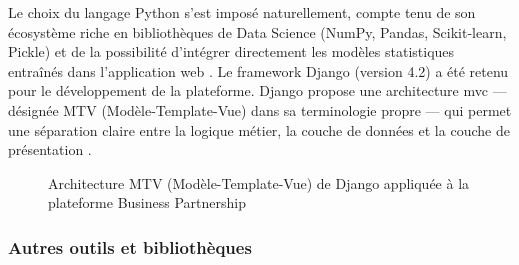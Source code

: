 \documentclass[12pt, a4paper, oneside]{report}
\begin{document}
Le choix du langage Python s'est imposé naturellement, compte tenu de son écosystème riche en bibliothèques de Data Science (NumPy, Pandas, Scikit-learn, Pickle) et de la possibilité d'intégrer directement les modèles statistiques entraînés dans l'application web \cite{python3}. Le framework Django (version 4.2) \cite{django} a été retenu pour le développement de la plateforme. Django propose une architecture \gls{mvc} --- désignée MTV (Modèle-Template-Vue) dans sa terminologie propre --- qui permet une séparation claire entre la logique métier, la couche de données et la couche de présentation \cite{holovaty2009}.

\begin{figure}[H]
  \centering
  \caption{Architecture MTV (Modèle-Template-Vue) de Django appliquée à la plateforme Business Partnership}
  \label{fig:django_mtv}
\end{figure}

\subsubsection{Autres outils et bibliothèques}
\end{document}
